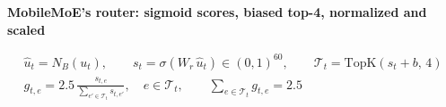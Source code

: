 \documentclass[border=40pt]{standalone}
\begin{document}
\begin{minipage}{26cm}
{\sffamily\bfseries\Large\color{muted} MobileMoE's router: sigmoid scores, biased top-4, normalized and scaled}\par\vspace{-14pt}
{\LARGE
\begin{gather*}
\hat u_t = N_B(u_t), \qquad s_t = \sigma(W_r\,\hat u_t) \in (0,1)^{60}, \qquad \mathcal{T}_t = \mathrm{TopK}(s_t + b,\,4)
\\[6pt]
g_{t,e} = 2.5\,\frac{s_{t,e}}{\sum_{e' \in \mathcal{T}_t} s_{t,e'}}, \quad e \in \mathcal{T}_t, \qquad \sum_{e \in \mathcal{T}_t} g_{t,e} = 2.5
\end{gather*}}
\end{minipage}
\end{document}

